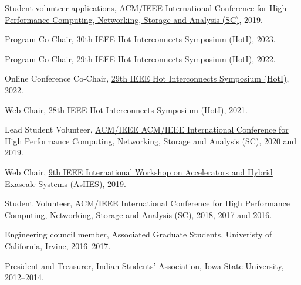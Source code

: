 \documentclass[11pt,article,oneside]{memoir}
\begin{document}
\ind Student volunteer applications, \href{https://sc19.supercomputing.org/}{ACM/IEEE International Conference for High Performance Computing, Networking, Storage and Analysis (SC)}, 2019.

\medskip

\ind Program Co-Chair, \href{https://hoti.org/}{30th IEEE Hot Interconnects Symposium (HotI)}, 2023.

\ind Program Co-Chair, \href{https://hoti.org/}{29th IEEE Hot Interconnects Symposium (HotI)}, 2022.

\ind Online Conference Co-Chair, \href{https://hoti.org/}{29th IEEE Hot Interconnects Symposium (HotI)}, 2022.

\ind Web Chair, \href{https://hoti.org/}{28th IEEE Hot Interconnects Symposium (HotI)}, 2021.

\ind Lead Student Volunteer, \href{https://sc20.supercomputing.org/2020/07/07/eighteen-sc20-lead-student-volunteers-announced/}{ACM/IEEE ACM/IEEE International Conference for High Performance Computing, Networking, Storage and Analysis (SC)}, 2020 and 2019.

\ind Web Chair, \href{https://www.mcs.anl.gov/events/workshops/ashes/2019/organizers.php}{9th IEEE International Workshop on Accelerators and Hybrid Exascale Systems (AsHES)}, 2019.

\ind Student Volunteer, ACM/IEEE International Conference for High Performance Computing, Networking, Storage and Analysis (SC), 2018, 2017 and 2016.

\medskip

\ind Engineering council member, Associated Graduate Students, Univeristy of California, Irvine, 2016--2017.

\ind President and Treasurer, Indian Students' Association, Iowa State University, 2012--2014.
\end{document}
